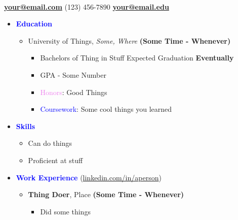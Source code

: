\documentclass[11pt]{article}
\begin{document}
\begin{flushleft}

    \makebox[\textwidth]{\LARGE \textbf{\textcolor{teal}{Your Name}}}\\

\setlength{\parindent}{0.5in}

\begin{multicols}{2}
    \textbf{\href{mailto:your@email.com}{your@email.com}} \textemdash{} (123) 456-7890
    \textbf{\href{mailto:your@email.edu}{your@email.edu}}
\end{multicols}

\begin{itemize}
    \item[] \Large \textcolor{blue}{\textbf{Education}} \normalsize
        \begin{itemize}
            \item University of Things, \textit{Some, Where}  \hfill{\textbf{(Some Time - Whenever)}}
                \begin{itemize}
                    \item Bachelors of Thing in Stuff \hfill{Expected Graduation \textbf{Eventually}}
                    \item GPA - Some Number
                    \item \textcolor{violet}{Honors}: Good Things
                    \item \textcolor{blue}{Coursework}: Some cool things you learned
                \end{itemize}
        \end{itemize}
    \item[] \Large \textcolor{blue}{\textbf{Skills}} \normalsize
        \begin{itemize}
            \item Can do things
            \item Proficient at stuff
        \end{itemize}
    \item[] \Large \textcolor{blue}{\textbf{Work Experience}} (\href{https://linkedin.com/in/aperson}{linkedin.com/in/aperson}) \normalsize
        \begin{itemize}
            \item \textbf{Thing Doer}, Place \hfill{\textbf{(Some Time - Whenever)}}
                \begin{itemize}
                    \item Did some things
                \end{itemize}

\end{itemize}
\end{itemize}
\end{flushleft}
\end{document}
